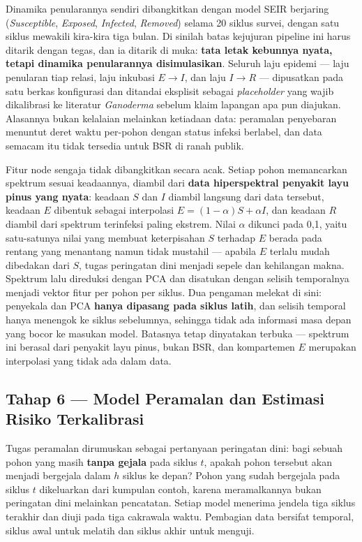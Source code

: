 Dinamika penularannya sendiri dibangkitkan dengan model SEIR berjaring
(\textit{Susceptible}, \textit{Exposed}, \textit{Infected}, \textit{Removed}) selama 20
siklus survei, dengan satu siklus mewakili kira-kira tiga bulan. Di sinilah batas
kejujuran pipeline ini harus ditarik dengan tegas, dan ia ditarik di muka: \textbf{tata
letak kebunnya nyata, tetapi dinamika penularannya disimulasikan}. Seluruh laju epidemi
--- laju penularan tiap relasi, laju inkubasi $E \rightarrow I$, dan laju $I \rightarrow R$
--- dipusatkan pada satu berkas konfigurasi dan ditandai eksplisit sebagai
\textit{placeholder} yang wajib dikalibrasi ke literatur \textit{Ganoderma} sebelum klaim
lapangan apa pun diajukan. Alasannya bukan kelalaian melainkan ketiadaan data: peramalan
penyebaran menuntut deret waktu per-pohon dengan status infeksi berlabel, dan data
semacam itu tidak tersedia untuk BSR di ranah publik.

Fitur node sengaja tidak dibangkitkan secara acak. Setiap pohon memancarkan spektrum
sesuai keadaannya, diambil dari \textbf{data hiperspektral penyakit layu pinus yang
nyata}: keadaan $S$ dan $I$ diambil langsung dari data tersebut, keadaan $E$ dibentuk
sebagai interpolasi $E = (1-\alpha)S + \alpha I$, dan keadaan $R$ diambil dari spektrum
terinfeksi paling ekstrem. Nilai $\alpha$ dikunci pada 0{,}1, yaitu satu-satunya nilai
yang membuat keterpisahan $S$ terhadap $E$ berada pada rentang yang menantang namun tidak
mustahil --- apabila $E$ terlalu mudah dibedakan dari $S$, tugas peringatan dini menjadi
sepele dan kehilangan makna. Spektrum lalu direduksi dengan PCA dan disatukan dengan
selisih temporalnya menjadi vektor fitur per pohon per siklus. Dua pengaman melekat di
sini: penyekala dan PCA \textbf{hanya dipasang pada siklus latih}, dan selisih temporal
hanya menengok ke siklus sebelumnya, sehingga tidak ada informasi masa depan yang bocor
ke masukan model. Batasnya tetap dinyatakan terbuka --- spektrum ini berasal dari penyakit
layu pinus, bukan BSR, dan kompartemen $E$ merupakan interpolasi yang tidak ada dalam data.

\subsection{Tahap 6 --- Model Peramalan dan Estimasi Risiko Terkalibrasi}

Tugas peramalan dirumuskan sebagai pertanyaan peringatan dini: bagi sebuah pohon yang
masih \textbf{tanpa gejala} pada siklus $t$, apakah pohon tersebut akan menjadi bergejala
dalam $h$ siklus ke depan? Pohon yang sudah bergejala pada siklus $t$ dikeluarkan dari
kumpulan contoh, karena meramalkannya bukan peringatan dini melainkan pencatatan. Setiap
model menerima jendela tiga siklus terakhir dan diuji pada tiga cakrawala waktu.
Pembagian data bersifat temporal, siklus awal untuk melatih dan siklus akhir untuk menguji.


